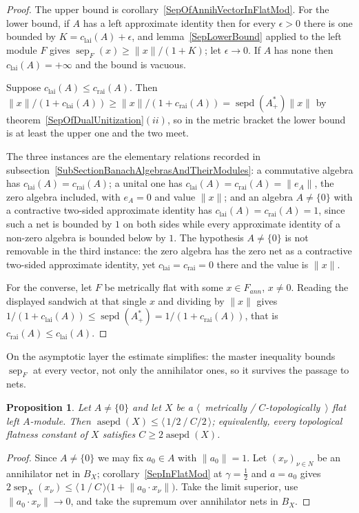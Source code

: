 \documentclass[11pt]{article}
\theoremstyle{plain}
\newtheorem{proposition}[theorem]{Proposition}
\theoremstyle{definition}
\DeclareMathOperator{\sep}{sep}
\DeclareMathOperator{\sepd}{sepd}
\DeclareMathOperator{\asepd}{asepd}
\newcommand{\crai}{c_{\mathrm{rai}}}
\newcommand{\clai}{c_{\mathrm{lai}}}
\begin{document}
\begin{proof}
The upper bound is corollary~\ref{SepOfAnnihVectorInFlatMod}. For the lower
bound, if $A$ has a left approximate identity then for every $\epsilon>0$ there
is one bounded by $K=\clai(A)+\epsilon$, and lemma~\ref{SepLowerBound} applied to
the left module $F$ gives $\sep_F(x)\geq\lVert x\rVert/(1+K)$; let
$\epsilon\to 0$. If $A$ has none then $\clai(A)=+\infty$ and the bound is vacuous.

Suppose $\clai(A)\leq\crai(A)$. Then
$\lVert x\rVert/(1+\clai(A))\geq\lVert x\rVert/(1+\crai(A))
=\sepd(A_+^*)\lVert x\rVert$ by
theorem~\ref{SepOfDualUnitization}$(ii)$, so in the metric bracket the lower
bound is at least the upper one and the two meet.

The three instances are the elementary relations recorded in
subsection~\ref{SubSectionBanachAlgebrasAndTheirModules}: a commutative algebra
has $\clai(A)=\crai(A)$; a unital one has
$\clai(A)=\crai(A)=\lVert e_A\rVert$, the zero algebra included, with $e_A=0$ and
value $\lVert x\rVert$; and an algebra $A\neq \{0 \}$ with a contractive
two-sided approximate identity has $\clai(A)=\crai(A)=1$, since such a net is
bounded by $1$ on both sides while every approximate identity of a non-zero
algebra is bounded below by $1$. The hypothesis $A\neq \{0 \}$ is not removable
in the third instance: the zero algebra has the zero net as a contractive
two-sided approximate identity, yet $\clai=\crai=0$ there and the value is
$\lVert x\rVert$.

For the converse, let $F$ be metrically flat with some $x\in F_{ann}$,
$x\neq 0$. Reading the displayed sandwich at that single $x$ and dividing by
$\lVert x\rVert$ gives $1/(1+\clai(A))\leq\sepd(A_+^*)=1/(1+\crai(A))$, that is
$\crai(A)\leq\clai(A)$.
\end{proof}

On the asymptotic layer the estimate simplifies: the master inequality bounds
$\sep_F$ at every vector, not only the annihilator ones, so it survives the
passage to nets.

\begin{proposition}\label{AsympSepOfFlatMod}
Let $A\neq \{0 \}$ and let $X$ be a
$\langle$~metrically / $C$-topologically~$\rangle$ flat left $A$-module. Then
$\asepd(X)\leq\langle\,1/2\ /\ C/2\,\rangle$; equivalently, every topological
flatness constant of $X$ satisfies $C\geq 2\asepd(X)$.
\end{proposition}

\begin{proof}
Since $A\neq \{0 \}$ we may fix $a_0\in A$ with $\lVert a_0\rVert=1$. Let
${(x_\nu)}_{\nu\in N}$ be an annihilator net in $B_X$;
corollary~\ref{SepInFlatMod} at $\gamma=\tfrac{1}{2}$ and $a=a_0$ gives
$2\sep_X(x_\nu)\leq\langle\,1\ /\ C\,\rangle
\bigl(1+\lVert a_0\cdot x_\nu\rVert \bigr)$. Take the limit superior, use
$\lVert a_0\cdot x_\nu\rVert\to 0$, and take the supremum over annihilator nets
in $B_X$.
\end{proof}
\end{document}
